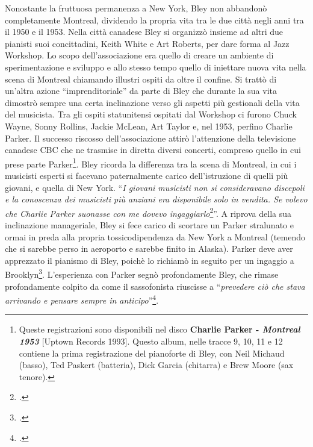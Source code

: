 Nonostante la fruttuosa permanenza a New York, Bley non abbandonò completamente Montreal, dividendo la propria vita tra le due città negli anni tra il 1950 e il 1953. Nella città canadese Bley si organizzò insieme ad altri due pianisti suoi concittadini, Keith White e Art Roberts, per dare forma al Jazz Workshop. Lo scopo dell'associazione era quello di creare un ambiente di sperimentazione e sviluppo e allo stesso tempo quello di iniettare nuova vita nella scena di Montreal chiamando illustri ospiti da oltre il confine. Si trattò di un'altra azione ``imprenditoriale'' da parte di Bley che durante la sua vita dimostrò sempre una certa inclinazione verso gli aspetti più gestionali della vita del musicista. Tra gli ospiti statunitensi ospitati dal Workshop ci furono Chuck Wayne, Sonny Rollins, Jackie McLean, Art Taylor e, nel 1953, perfino Charlie Parker. Il successo riscosso dell'associazione attirò l'attenzione della televisione canadese CBC che ne trasmise in diretta diversi concerti, compreso quello in cui prese parte Parker\footnote{Queste registrazioni sono disponibili nel disco \textbf{Charlie Parker - \textit{Montreal 1953}} [Uptown Records 1993]. Questo album, nelle tracce 9, 10, 11 e 12 contiene la prima registrazione del pianoforte di Bley, con Neil Michaud (basso), Ted Paskert (batteria), Dick Garcia (chitarra) e Brew Moore (sax tenore).}. Bley ricorda la differenza tra la scena di Montreal, in cui i musicisti esperti si facevano paternalmente carico dell'istruzione di quelli più giovani, e quella di New York. ``\textit{I giovani musicisti non si consideravano discepoli e la conoscenza dei musicisti più anziani era disponibile solo in vendita. Se volevo che Charlie Parker suonasse con me dovevo ingaggiarlo}\footcite[31]{stopping}''. A riprova della sua inclinazione manageriale, Bley si fece carico di scortare un Parker stralunato e ormai in preda alla propria tossicodipendenza da New York a Montreal (temendo che si sarebbe perso in aeroporto e sarebbe finito in Alaska). Parker deve aver apprezzato il pianismo di Bley, poichè lo richiamò in seguito per un ingaggio a Brooklyn\footcite[34]{stopping}. L'esperienza con Parker segnò profondamente Bley, che rimase profondamente colpito da come il sassofonista riuscisse a ``\textit{prevedere ciò che stava arrivando e pensare sempre in anticipo}''\footcite[35]{stopping}.\par

